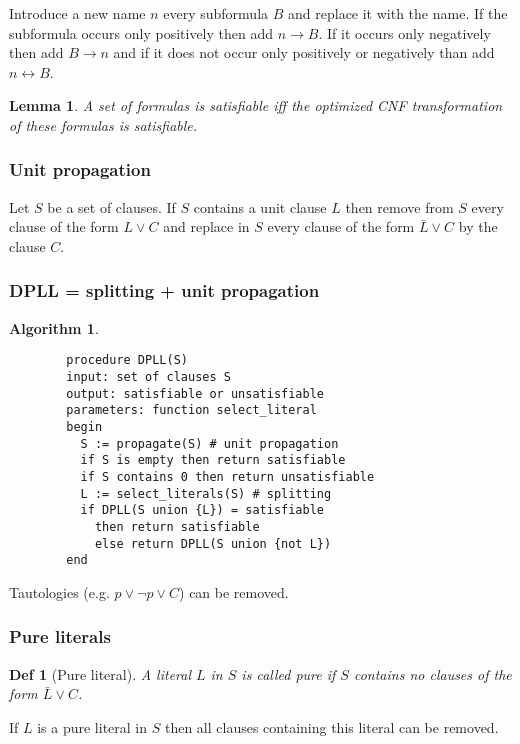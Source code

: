 \documentclass[]{article}
\newtheorem{lemma}{Lemma}
\newtheorem*{definition*}{Def}
\newtheorem{algorithm}{Algorithm}
\begin{document}
Introduce a new name $n$ every subformula $B$ and replace it with the name. If the subformula occurs only positively then add $n \rightarrow B$. If it occurs only negatively then add $B \rightarrow n$ and if it does not occur only positively or negatively than add $n \leftrightarrow B$.

\begin{lemma}
	A set of formulas is satisfiable iff the optimized CNF transformation of these formulas is satisfiable.
\end{lemma}

\subsubsection{Unit propagation}

Let $S$ be a set of clauses. If $S$ contains a unit clause $L$ then remove from $S$ every clause of the form $L \lor C$ and replace in $S$ every clause of the form $\bar{L} \lor C$ by the clause $C$.

\subsubsection{DPLL = splitting + unit propagation}

\begin{algorithm}
	\begin{verbatim}
		procedure DPLL(S)
		input: set of clauses S
		output: satisfiable or unsatisfiable
		parameters: function select_literal
		begin
		  S := propagate(S) # unit propagation
		  if S is empty then return satisfiable
		  if S contains 0 then return unsatisfiable
		  L := select_literals(S) # splitting
		  if DPLL(S union {L}) = satisfiable
		    then return satisfiable
		    else return DPLL(S union {not L})
		end
	\end{verbatim}
\end{algorithm}

Tautologies (e.g. $p \lor \lnot p \lor C$) can be removed.

\subsubsection{Pure literals}

\begin{definition*}[Pure literal]
	A literal $L$ in $S$ is called pure if $S$ contains no clauses of the form $\bar{L} \lor C$.
\end{definition*}

If $L$ is a pure literal in $S$ then all clauses containing this literal can be removed.
\end{document}
